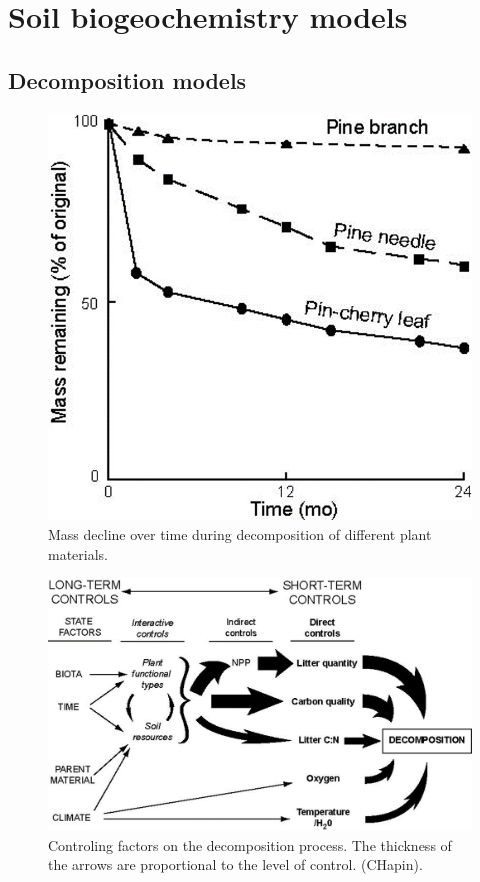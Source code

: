 \documentclass[12pt,oneside]{book}
\begin{document}
\section{Soil biogeochemistry models}\label{soil-biogeochemistry-models}

\subsection{Decomposition models}\label{decomposition-models}

\begin{figure}

{\centering \includegraphics[width=0.8\linewidth]{figures/chap5/f514_leaf_decomp} 

}

\caption{Mass decline over time during decomposition of different plant materials.}\label{fig:f514}
\end{figure}

\begin{figure}

{\centering \includegraphics[width=0.8\linewidth]{figures/chap5/f514_chapin_decomp_controls} 

}

\caption{Controling factors on the decomposition process. The thickness of the arrows are proportional to the level of control. (CHapin).}\label{fig:f514bis}
\end{figure}
\end{document}
